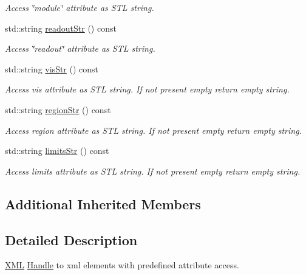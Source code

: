 \begin{DoxyCompactItemize}
\begin{DoxyCompactList}\small\item\em Access \char`\"{}module\char`\"{} attribute as S\+TL string. \end{DoxyCompactList}\item 
std\+::string \hyperlink{struct_d_d4hep_1_1_x_m_l_1_1_dimension_ada45ea46d8bf5ffe55bdbe73a4cfbab7}{readout\+Str} () const
\begin{DoxyCompactList}\small\item\em Access \char`\"{}readout\char`\"{} attribute as S\+TL string. \end{DoxyCompactList}\item 
std\+::string \hyperlink{struct_d_d4hep_1_1_x_m_l_1_1_dimension_aa84739ec3824bf2adf8e22c11a28d01c}{vis\+Str} () const
\begin{DoxyCompactList}\small\item\em Access vis attribute as S\+TL string. If not present empty return empty string. \end{DoxyCompactList}\item 
std\+::string \hyperlink{struct_d_d4hep_1_1_x_m_l_1_1_dimension_a69b88308f9c24cfb84d4bb7194528425}{region\+Str} () const
\begin{DoxyCompactList}\small\item\em Access region attribute as S\+TL string. If not present empty return empty string. \end{DoxyCompactList}\item 
std\+::string \hyperlink{struct_d_d4hep_1_1_x_m_l_1_1_dimension_a605b896d69d735a72116fa7daba9b39f}{limits\+Str} () const
\begin{DoxyCompactList}\small\item\em Access limits attribute as S\+TL string. If not present empty return empty string. \end{DoxyCompactList}\end{DoxyCompactItemize}
\subsection*{Additional Inherited Members}


\subsection{Detailed Description}
\hyperlink{namespace_d_d4hep_1_1_x_m_l}{X\+ML} \hyperlink{class_d_d4hep_1_1_handle}{Handle} to xml elements with predefined attribute access. 

